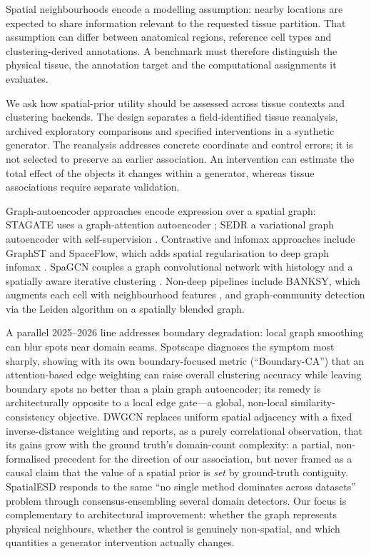 \documentclass[11pt]{article}
\begin{document}
Spatial neighbourhoods encode a modelling assumption: nearby locations are expected to share information relevant to the requested tissue partition. That assumption can differ between anatomical regions, reference cell types and clustering-derived annotations. A benchmark must therefore distinguish the physical tissue, the annotation target and the computational assignments it evaluates.

We ask how spatial-prior utility should be assessed across tissue contexts and clustering backends. The design separates a field-identified tissue reanalysis, archived exploratory comparisons and specified interventions in a synthetic generator. The reanalysis addresses concrete coordinate and control errors; it is not selected to preserve an earlier association. An intervention can estimate the total effect of the objects it changes within a generator, whereas tissue associations require separate validation.

\noindent
Graph-autoencoder approaches encode expression over a spatial graph:
STAGATE uses a graph-attention autoencoder \citep{dong2022stagate}; SEDR a variational graph autoencoder
with self-supervision \citep{xu2024sedr}. Contrastive and infomax approaches include GraphST
\citep{long2023graphst} and SpaceFlow, which adds spatial regularisation to deep graph infomax
\citep{ren2022spaceflow}. SpaGCN couples a graph convolutional network with histology and a spatially
aware iterative clustering \citep{hu2021spagcn}. Non-deep pipelines include BANKSY, which augments each
cell with neighbourhood features \citep{singhal2024banksy}, and graph-community detection via the Leiden
algorithm \citep{traag2019leiden} on a spatially blended graph.

A parallel
2025--2026 line addresses boundary degradation: local graph smoothing can blur spots near domain seams. Spotscape \citep{oh2025spotscape} diagnoses the symptom most sharply,
showing with its own boundary-focused metric (``Boundary-CA'') that an attention-based edge weighting can
raise overall clustering accuracy while leaving boundary spots no better than a plain graph autoencoder;
its remedy is architecturally opposite to a local edge gate---a global, non-local similarity-consistency
objective. DWGCN \citep{peng2026dwgcn} replaces uniform spatial adjacency with a fixed inverse-distance
weighting and reports, as a purely correlational observation, that its gains grow with the ground truth's
domain-count complexity: a partial, non-formalised precedent for the direction of our association, but never
framed as a causal claim that the value of a spatial prior is \emph{set} by ground-truth contiguity.
SpatialESD \citep{cao2025spatialesd} responds to the same ``no single method dominates across datasets''
problem through consensus-ensembling several domain detectors. Our focus is complementary to architectural improvement: whether the graph represents physical neighbours, whether the control is genuinely non-spatial, and which quantities a generator intervention actually changes.
\end{document}
